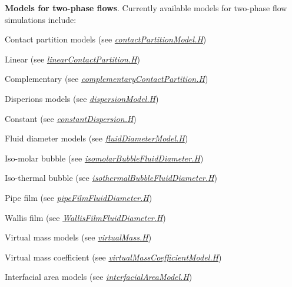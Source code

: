  {\bfseries Models for two-\/phase flows}. Currently available models for two-\/phase flow simulations include\+: 
\begin{DoxyItemize}
\item Contact partition models (see {\itshape \hyperlink{contactPartitionModel_8H}{contact\+Partition\+Model.\+H}}) 
\begin{DoxyItemize}
\item Linear (see {\itshape \hyperlink{linearContactPartition_8H}{linear\+Contact\+Partition.\+H}}) 
\item Complementary (see {\itshape \hyperlink{complementaryContactPartition_8H}{complementary\+Contact\+Partition.\+H}}) 
\end{DoxyItemize}
\item Disperions models (see {\itshape \hyperlink{dispersionModel_8H}{dispersion\+Model.\+H}}) 
\begin{DoxyItemize}
\item Constant (see {\itshape \hyperlink{constantDispersion_8H}{constant\+Dispersion.\+H}}) 
\end{DoxyItemize}
\item Fluid diameter models (see {\itshape \hyperlink{fluidDiameterModel_8H}{fluid\+Diameter\+Model.\+H}}) 
\begin{DoxyItemize}
\item Iso-\/molar bubble (see {\itshape \hyperlink{isomolarBubbleFluidDiameter_8H}{isomolar\+Bubble\+Fluid\+Diameter.\+H}}) 
\item Iso-\/thermal bubble (see {\itshape \hyperlink{isothermalBubbleFluidDiameter_8H}{isothermal\+Bubble\+Fluid\+Diameter.\+H}}) 
\item Pipe film (see {\itshape \hyperlink{pipeFilmFluidDiameter_8H}{pipe\+Film\+Fluid\+Diameter.\+H}}) 
\item Wallis film (see {\itshape \hyperlink{WallisFilmFluidDiameter_8H}{Wallis\+Film\+Fluid\+Diameter.\+H}}) 
\end{DoxyItemize}
\item Virtual mass models (see {\itshape \hyperlink{virtualMass_8H}{virtual\+Mass.\+H}}) 
\begin{DoxyItemize}
\item Virtual mass coefficient (see {\itshape \hyperlink{virtualMassCoefficientModel_8H}{virtual\+Mass\+Coefficient\+Model.\+H}}) 
\end{DoxyItemize}
\item Interfacial area models (see {\itshape \hyperlink{interfacialAreaModel_8H}{interfacial\+Area\+Model.\+H}}) 

\end{DoxyItemize}
